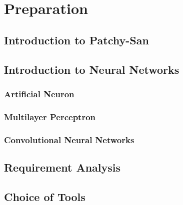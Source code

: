 
    
    \chapter{Preparation}

    \section{Introduction to Patchy-San}
    
    \section{Introduction to Neural Networks}
        
        \subsection{Artificial Neuron}
        
        \subsection{Multilayer Perceptron}
        
        \subsection{Convolutional Neural Networks}
        
        
    \subsection{}
    
    \subsection{}
    
    \subsection{}
    
    \section{Requirement Analysis}
    
    \section{Choice of Tools}
    
